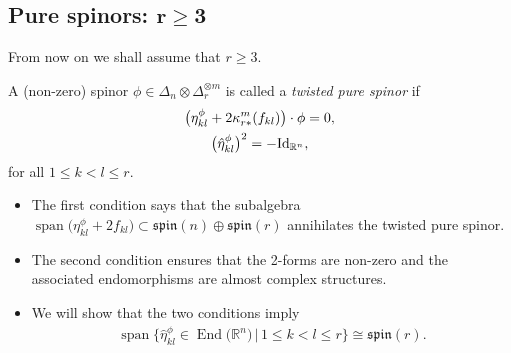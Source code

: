 \documentclass[10pt,a4paper]{amsart}
\numberwithin{equation}{section}
\begin{document}
\subsection[Pure spinors: $r\geq 3$]{Pure spinors: $\boldsymbol{r\geq 3}$}

From now on we shall assume that $r\geq 3$.

\begin{Definition} \label{def:pure-spinor}A (non-zero) spinor $\phi\in\Delta_n\otimes \Delta_r^{\otimes m}$ is called a {\em twisted pure spinor} if
\begin{gather}
\big(\eta_{kl}^\phi + 2 \kappa_{r*}^m(f_{kl})\big)\cdot \phi = 0,\label{eq: pure spinor condition 1}\\
\big(\hat\eta_{kl}^{\phi}\big)^2 = - {\rm Id}_{\mathbb{R}^n},\label{eq: pure spinor condition 2}
\end{gather}
for all $1\leq k<l\leq r$.
\end{Definition}

\begin{Remark}\quad
\begin{itemize}\itemsep=0pt
 \item The first condition says that the subalgebra $\operatorname{span}\big(\eta_{kl}^\phi+2f_{kl}\big) \subset\mathfrak{spin}(n)\oplus\mathfrak{spin}(r)$ annihilates the twisted pure spinor.
 \item The second condition ensures that the 2-forms are non-zero and the associated endomorphisms are almost complex structures.
 \item We will show that the two conditions imply
 \begin{gather*}\operatorname{span}\big\{\hat\eta_{kl}^\phi\in \operatorname{End}\big(\mathbb{R}^n\big)\,|\,1\leq k<l\leq r\big\}\cong\mathfrak{spin}(r).\end{gather*}
\end{itemize}
\end{Remark}
\end{document}
